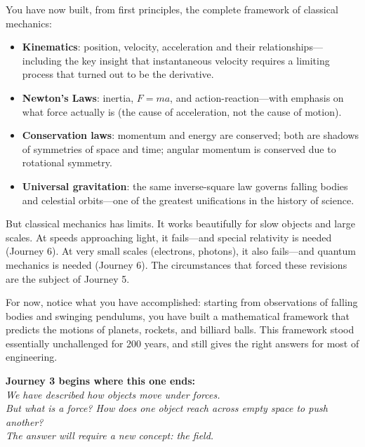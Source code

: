 \documentclass[12pt, a4paper, twoside]{book}
\theoremstyle{disc}
\begin{document}
You have now built, from first principles, the complete framework of classical mechanics:

\begin{itemize}[leftmargin=2em, itemsep=4pt]
  \item \textbf{Kinematics}: position, velocity, acceleration and their relationships---including the key insight that instantaneous velocity requires a limiting process that turned out to be the derivative.
  \item \textbf{Newton's Laws}: inertia, $F = ma$, and action-reaction---with emphasis on what force actually is (the cause of acceleration, not the cause of motion).
  \item \textbf{Conservation laws}: momentum and energy are conserved; both are shadows of symmetries of space and time; angular momentum is conserved due to rotational symmetry.
  \item \textbf{Universal gravitation}: the same inverse-square law governs falling bodies and celestial orbits---one of the greatest unifications in the history of science.
\end{itemize}

But classical mechanics has limits. It works beautifully for slow objects and large scales. At speeds approaching light, it fails---and special relativity is needed (Journey 6). At very small scales (electrons, photons), it also fails---and quantum mechanics is needed (Journey 6). The circumstances that forced these revisions are the subject of Journey 5.

For now, notice what you have accomplished: starting from observations of falling bodies and swinging pendulums, you have built a mathematical framework that predicts the motions of planets, rockets, and billiard balls. This framework stood essentially unchallenged for 200 years, and still gives the right answers for most of engineering.

\vspace{0.8cm}
\begin{center}
\end{center}

\vspace{0.6cm}
\begin{center}
{\large\textcolor{deep}{\textbf{Journey 3 begins where this one ends:}}}\\[6pt]
{\itshape\textcolor{midblue}{
We have described how objects move under forces.\\[3pt]
But what \emph{is} a force? How does one object reach across empty space to push another?\\[3pt]
The answer will require a new concept: the field.
}}
\end{center}
\end{document}
